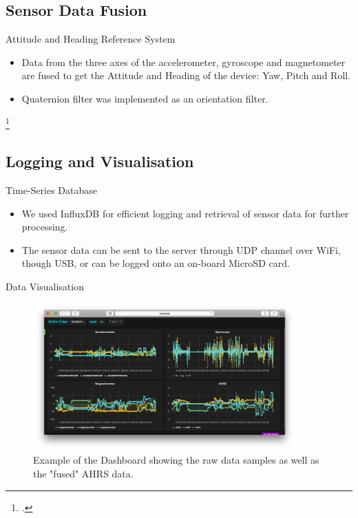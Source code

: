 \documentclass{beamer}
\begin{document}
\subsection{Sensor Data Fusion}
\begin{frame}{Attitude and Heading Reference System}
  \begin{itemize}
  \item{
    Data from the three axes of the accelerometer, gyroscope and magnetometer are fused to get the Attitude and Heading of the device: Yaw, Pitch and Roll.
  }
  \item{
    Quaternion filter was implemented as an orientation filter\footnotemark.
  }
  \end{itemize}
\footcitetext{Madgwick2011}
\end{frame}
\subsection{Logging and Visualisation}
\begin{frame}{Time-Series Database}
  \begin{itemize}
  \item{
    We used InfluxDB for efficient logging and retrieval of sensor data for further processing.
  }
  \item{
    The sensor data can be sent to the server through UDP channel over WiFi, though USB, or can be logged onto an on-board MicroSD card.
  }
  \end{itemize}
\end{frame}
\begin{frame}{Data Visualisation}
    \begin{figure}[h]
    \centering
    \includegraphics[width=0.9\textwidth]{grafana_dbd.png}
    \caption{Example of the Dashboard showing the raw data samples as well as the "fused" AHRS data.}
    \end{figure}
\end{frame}
\end{document}
